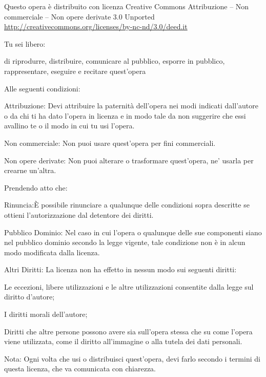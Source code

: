 
{\smaller\setlength{\parindent}{0pt}%
\raggedright\label{copyright-details}
{\centering

{\large\ccbyncnd}
\bigskip

Questo opera è distribuito con licenza Creative Commons Attribuzione – Non commerciale – Non opere derivate 3.0 Unported\\
\href{http://creativecommons.org/licenses/by-nc-nd/3.0/deed.it}{http://creativecommons.org/licenses/by-nc-nd/3.0/deed.it}

}
\bigskip

Tu sei libero:
\vspace*{-\baselineskip}

\begin{packeditemize}
\item di riprodurre, distribuire, comunicare al pubblico, esporre in pubblico, rappresentare, eseguire e recitare quest'opera
\end{packeditemize}

Alle seguenti condizioni:
\vspace*{-\baselineskip}

\begin{packeditemize}
\item Attribuzione: Devi attribuire la paternità dell'opera nei modi indicati dall'autore o da chi ti ha dato l'opera in licenza e in modo tale da non suggerire che essi avallino te o il modo in cui tu usi l'opera.
\item Non commerciale: Non puoi usare quest'opera per fini commerciali.
\item Non opere derivate: Non puoi alterare o trasformare quest'opera, ne' usarla per crearne un'altra.
\end{packeditemize}

Prendendo atto che:
\vspace*{-\baselineskip}

\begin{packeditemize}
\item Rinuncia:È possibile rinunciare a qualunque delle condizioni sopra descritte se ottieni l'autorizzazione dal detentore dei diritti.
\item Pubblico Dominio: Nel caso in cui l'opera o qualunque delle sue componenti siano nel pubblico dominio secondo la legge vigente, tale condizione non è in alcun modo modificata dalla licenza.
\item Altri Diritti: La licenza non ha effetto in nessun modo sui seguenti diritti:
\begin{packeditemize}
\item Le eccezioni, libere utilizzazioni e le altre utilizzazioni consentite dalla legge sul diritto d'autore;
\item I diritti morali dell'autore;
\item Diritti che altre persone possono avere sia sull'opera stessa che su come l'opera viene utilizzata, come il diritto all'immagine o alla tutela dei dati personali.
\end{packeditemize}
\item Nota: Ogni volta che usi o distribuisci quest'opera, devi farlo secondo i termini di questa licenza, che va comunicata con chiarezza.
\end{packeditemize}

}
